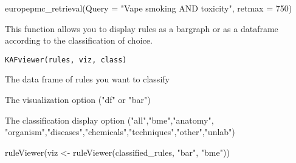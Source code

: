 \documentclass[a4paper]{book}
\begin{document}
%
\begin{Examples}
\begin{ExampleCode}
europepmc_retrieval(Query = "Vape smoking AND toxicity", retmax = 750)
\end{ExampleCode}
\end{Examples}
%
\begin{Description}\relax
This function allows you to display rules as a bargraph or as a dataframe according to the classification of choice.
\end{Description}
%
\begin{Usage}
\begin{verbatim}
KAFviewer(rules, viz, class)
\end{verbatim}
\end{Usage}
%
\begin{Arguments}
\begin{ldescription}
\item[\code{rules}] The data frame of rules you want to classify

\item[\code{viz}] The visualization option ("df" or "bar")

\item[\code{class}] The classification display option ("all","bme","anatomy", "organism","diseases","chemicals","techniques","other","unlab")
\end{ldescription}
\end{Arguments}
%
\begin{Examples}
\begin{ExampleCode}
ruleViewer(viz <- ruleViewer(classified_rules, "bar", "bme"))
\end{ExampleCode}
\end{Examples}
\end{document}

